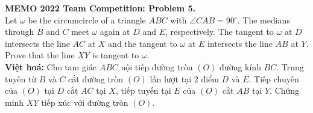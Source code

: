 \documentclass[12pt,a4paper]{article}
\begin{document}
	
\setlength{\parindent}{0pt}
	
\textbf{MEMO 2022 Team Competition: Problem 5.} \\

Let $\omega$ be the circumcircle of a triangle $ABC$ with $\angle CAB=90^{\circ}$. The medians through $B$ and $C$ meet $\omega$ again at $D$ and $E$, respectively. The tangent to $\omega$ at $D$ intersects the line $AC$ at $X$ and the tangent to $\omega$ at $E$ intersects the line $AB$ at $Y$. Prove that the line $XY$ is tangent to $\omega$.\\

\textbf{Việt hoá:} Cho tam giác $ABC$ nội tiếp đường tròn $(O)$ đường kính $BC$. Trung tuyến từ $B$ và $C$ cắt đường tròn $(O)$ lần lượt tại 2 điểm $D$ và $E$. Tiếp chuyến của $(O)$ tại $D$ cắt $AC$ tại $X$, tiếp tuyến tại $E$ của $(O)$ cắt $AB$ tại $Y$. Chứng minh $XY$ tiếp xúc với đường tròn $(O)$.\\
\end{document}

